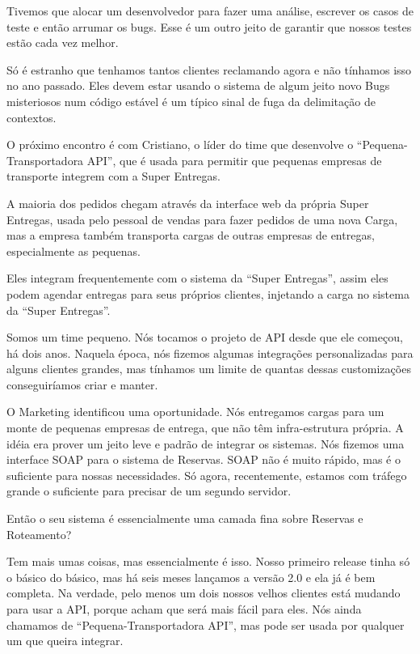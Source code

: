 \documentclass[12pt,play]{article}
\begin{document}
Tivemos que alocar um desenvolvedor para fazer uma análise, escrever os casos de teste e então arrumar os bugs. Esse é um outro jeito de garantir que nossos testes estão cada vez melhor.

Só é estranho que tenhamos tantos clientes reclamando agora e não tínhamos isso no ano passado. Eles devem estar usando o sistema de algum jeito novo
\narr Bugs misteriosos num código estável é um típico sinal de fuga da delimitação de contextos.

\scene
\narr O próximo encontro é com Cristiano, o líder do time que desenvolve o ``Pequena-Transportadora API'', que é usada para permitir que pequenas empresas de transporte integrem com a Super Entregas.

A maioria dos pedidos chegam através da interface web da própria Super Entregas, usada pelo pessoal de vendas para fazer pedidos de uma nova Carga, mas a empresa também transporta cargas de outras empresas de entregas, especialmente as pequenas.

Eles integram frequentemente com o sistema da ``Super Entregas'', assim eles podem agendar entregas para seus próprios clientes, injetando a carga no sistema da ``Super Entregas''.

\cris Somos um time pequeno. Nós tocamos o projeto de API desde que ele começou, há dois anos. Naquela época, nós fizemos algumas integrações personalizadas para alguns clientes grandes, mas tínhamos um limite de quantas dessas customizações conseguiríamos criar e manter.

O Marketing identificou uma oportunidade. Nós entregamos cargas para um monte de pequenas empresas de entrega, que não têm infra-estrutura própria. A idéia era prover um jeito leve e padrão de integrar os sistemas. Nós fizemos uma interface SOAP para o sistema de Reservas. SOAP não é muito rápido, mas é o suficiente para nossas necessidades. Só agora, recentemente, estamos com tráfego grande o suficiente para precisar de um segundo servidor.

\serg Então o seu sistema é essencialmente uma camada fina sobre Reservas e Roteamento?

\cris Tem mais umas coisas, mas essencialmente é isso. Nosso primeiro release tinha só o básico do básico, mas há seis meses lançamos a versão 2.0 e ela já é bem completa. Na verdade, pelo menos um dois nossos velhos clientes está mudando para usar a API, porque acham que será mais fácil para eles. Nós ainda chamamos de ``Pequena-Transportadora API'', mas pode ser usada por qualquer um que queira integrar.
\end{document}

